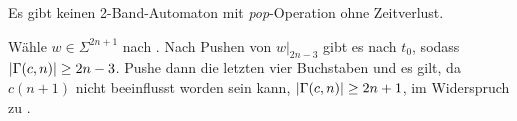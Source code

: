 \documentclass{article}
\begin{document}
\begin{satz}
    Es gibt keinen 2-Band-Automaton mit \emph{pop}-Operation ohne Zeitverlust.
    \begin{beweis}
        Wähle $w \in \Sigma^{2n+1}$ nach . Nach Pushen von $w \big|_{2n-3}$ gibt es nach  $t_0$, sodass $\lvert\Gamma(c,n)\rvert \geq 2n-3$. Pushe dann die letzten vier Buchstaben und es gilt, da $c(n+1)$ nicht beeinflusst worden sein kann, $\lvert\Gamma(c,n)\rvert \geq 2n+1$, im Widerspruch zu .
    \end{beweis}
\end{satz}
\end{document}
